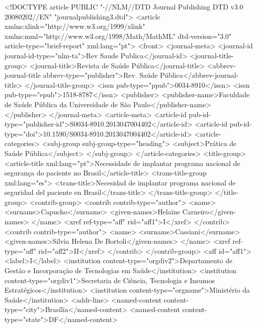 <!DOCTYPE article PUBLIC "-//NLM//DTD Journal Publishing DTD v3.0 20080202//EN" "journalpublishing3.dtd">
<article xmlns:xlink="http://www.w3.org/1999/xlink" xmlns:mml="http://www.w3.org/1998/Math/MathML"
  dtd-version="3.0" article-type="brief-report" xml:lang="pt">
  <front>
    <journal-meta>
      <journal-id journal-id-type="nlm-ta">Rev Saude Publica</journal-id>
      <journal-title-group>
        <journal-title>Revista de Saúde Pública</journal-title>
        <abbrev-journal-title abbrev-type="publisher">Rev. Saúde Pública</abbrev-journal-title>
      </journal-title-group>
      <issn pub-type="ppub">0034-8910</issn>
      <issn pub-type="epub">1518-8787</issn>
      <publisher>
        <publisher-name>Faculdade de Saúde Pública da Universidade de São Paulo</publisher-name>
      </publisher>
    </journal-meta>
    <article-meta>
      <article-id pub-id-type="publisher-id">S0034-8910.2013047004402</article-id>
      <article-id pub-id-type="doi">10.1590/S0034-8910.2013047004402</article-id>
      <article-categories>
        <subj-group subj-group-type="heading">
          <subject>Prática de Saúde Pública</subject>
        </subj-group>
      </article-categories>
      <title-group>
        <article-title xml:lang="pt">Necessidade de implantar programa nacional de segurança do
          paciente no Brasil</article-title>
        <trans-title-group xml:lang="es">
          <trans-title>Necesidad de implantar programa nacional de seguridad del paciente en
            Brasil</trans-title>
        </trans-title-group>
      </title-group>
      <contrib-group>
        <contrib contrib-type="author">
          <name>
            <surname>Capucho</surname>
            <given-names>Helaine Carneiro</given-names>
          </name>
          <xref ref-type="aff" rid="aff1">I</xref>
        </contrib>
        <contrib contrib-type="author">
          <name>
            <surname>Cassiani</surname>
            <given-names>Silvia Helena De Bortoli</given-names>
          </name>
          <xref ref-type="aff" rid="aff2">II</xref>
        </contrib>
      </contrib-group>
      <aff id="aff1">
        <label>I</label>
        <institution content-type="orgdiv2">Departamento de Gestão e Incorporação de Tecnologias em
          Saúde</institution>
        <institution content-type="orgdiv1">Secretaria de Ciência, Tecnologia e Insumos
          Estratégicos</institution>
        <institution content-type="orgname">Ministério da Saúde</institution>
        <addr-line>
          <named-content content-type="city">Brasília</named-content>
          <named-content content-type="state">DF</named-content>
